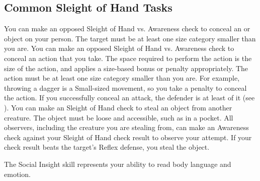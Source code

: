   \subsection{Common Sleight of Hand Tasks}
     You can make an opposed Sleight of Hand vs. Awareness check to conceal an  or  object on your person.
    The target must be at least one size category smaller than you are.
     You can make an opposed Sleight of Hand vs. Awareness check to conceal an action that you take.
    The space required to perform the action is the size of the action, and applies a size-based bonus or penalty appropriately.
    The action must be at least one size category smaller than you are.
    For example, throwing a dagger is a Small-sized movement, so you take a  penalty to conceal the action.
    If you successfully conceal an attack, the defender is at least \partiallyunaware of it (see ).
     You can make an Sleight of Hand check to steal an object from another creature.
    The object must be loose and accessible, such as in a pocket.
    All observers, including the creature you are stealing from, can make an Awareness check against your Sleight of Hand check result to observe your attempt.
    If your check result beats the target's Reflex defense, you steal the object.

\newpage
{}
  The Social Insight skill represents your ability to read body language and emotion.

